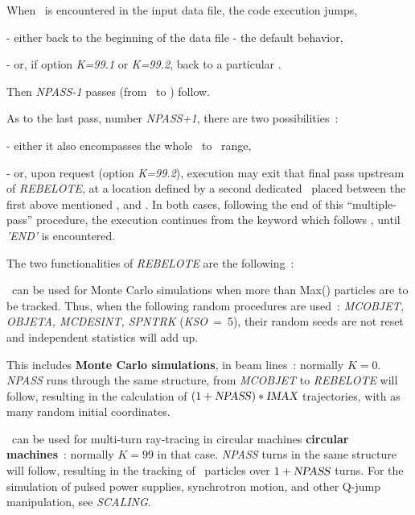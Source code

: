 {When \REBELOTE\ is encountered in the input data file, the code execution jumps, 

- either back to the beginning of the data file - the default behavior,  

- or, if option \textsl{K=99.1} or \textsl{K=99.2}, back to a particular \LABEL. 

\noindent  Then  \textsl{NPASS-1} passes (from \LABEL\ to  \REBELOTE) follow.  

\noindent As to the last pass, number  \textsl{NPASS+1}, there are two possibilities~: 

- either it also encompasses the whole \LABEL\ to  \REBELOTE\ range, 

- or, upon request (option \textsl{K=99.2}),  execution may exit that final  pass upstream of 
\textsl{REBELOTE}, at a location defined by a second   dedicated \LABEL\ placed  between 
the first above mentioned \LABEL, and \REBELOTE. 
In both cases, following the end of this ``multiple-pass'' procedure, 
the execution  continues from the keyword which follows \REBELOTE, until \textsl{'END'} is encountered. 

\bigskip

\noindent The two functionalities of \textsl{REBELOTE} are the following~: 

\medskip

\noindent {\small $\bullet$} \REBELOTE\ can be used for Monte Carlo simulations when more 
than Max(\IMAX) particles   are to be tracked. 
Thus, when the following random procedures 
are used~: \textsl{MCOBJET, OBJETA, MCDESINT, 
SPNTRK} \mbox{(\textsl{KSO} = 5)},
their random seeds are not reset and  independent statistics will add up. 

\noindent This includes  \textbf{Monte Carlo simulations}, in beam lines~: normally $ K=0$.  \textsl{NPASS} runs
through the same structure, from \textsl{MCOBJET} to \textsl{REBELOTE} will follow, resulting in the calculation of 
$(1+\text{\textsl{NPASS}})  \ast  \text{\ensuremath{\textsl{IMAX}}}$ trajectories, with as many random initial coordinates. 

\bigskip

\noindent {\small $\bullet$} \REBELOTE\ can be used for  multi-turn ray-tracing   
in circular machines \textbf{circular machines}~: normally $ K=99$ in that case.  \textsl{NPASS} turns in
the same structure will follow, resulting in the tracking of \IMAX\ 
particles over $1+\text{\textsl{NPASS}}$ turns. For the simulation of 
pulsed power supplies, synchrotron motion, and other Q-jump manipulation, see \textsl{SCALING}. 

}
